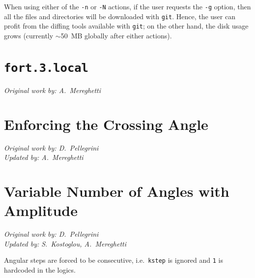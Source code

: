 When using either of the \texttt{-n} or \texttt{-N} actions,
if the user requests the \texttt{-g} option, then all the files
and directories will be downloaded with \texttt{git}. Hence, the
user can profit from the diffing tools available with \texttt{git};
on the other hand, the disk usage grows (currently $\sim$50~MB
globally after either actions).

\section{\texttt{fort.3.local}} \label{fort3local}
\begin{flushright}
\emph{Original work by: A.~Mereghetti}
\end{flushright}

\section{Enforcing the Crossing Angle} \label{EnforceXingAngle}
\begin{flushright}
\emph{Original work by: D.~Pellegrini} \\
\emph{Updated by: A.~Mereghetti}
\end{flushright}

\section{Variable Number of Angles with Amplitude} \label{varAnglesWithAmpli}
\begin{flushright}
\emph{Original work by: D.~Pellegrini} \\
\emph{Updated by: S.~Kostoglou, A.~Mereghetti}
\end{flushright}
Angular steps are forced to be consecutive, i.e.~\texttt{kstep} is
ignored and \texttt{1} is hardcoded in the logics.

